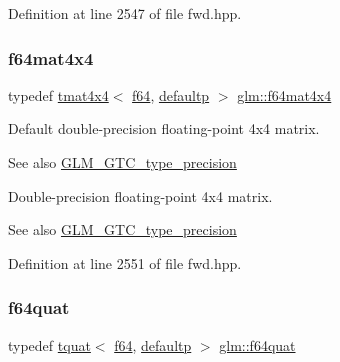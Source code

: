 Definition at line 2547 of file fwd.\+hpp.

\mbox{\label{group__gtc__type__precision_ga6b1ada50de2fc7d991138ab857fb2476}} 
\subsubsection{\texorpdfstring{f64mat4x4}{f64mat4x4}}
{\footnotesize\ttfamily typedef \mbox{\hyperlink{structglm_1_1tmat4x4}{tmat4x4}}$<$ \mbox{\hyperlink{group__gtc__type__precision_ga2bba392e555124b36cde6abba349bab3}{f64}}, \mbox{\hyperlink{namespaceglm_a0f04f086094c747d227af4425893f545a9d21ccd8b5a009ec7eb7677befc3bf51}{defaultp}} $>$ \mbox{\hyperlink{group__gtc__type__precision_ga6b1ada50de2fc7d991138ab857fb2476}{glm\+::f64mat4x4}}}

Default double-\/precision floating-\/point 4x4 matrix. \begin{DoxySeeAlso}{See also}
\mbox{\hyperlink{group__gtc__type__precision}{G\+L\+M\+\_\+\+G\+T\+C\+\_\+type\+\_\+precision}}
\end{DoxySeeAlso}
Double-\/precision floating-\/point 4x4 matrix. \begin{DoxySeeAlso}{See also}
\mbox{\hyperlink{group__gtc__type__precision}{G\+L\+M\+\_\+\+G\+T\+C\+\_\+type\+\_\+precision}} 
\end{DoxySeeAlso}


Definition at line 2551 of file fwd.\+hpp.

\mbox{\label{group__gtc__type__precision_ga5b54d7b36fbee5e271f73e6ed74e7172}} 
\subsubsection{\texorpdfstring{f64quat}{f64quat}}
{\footnotesize\ttfamily typedef \mbox{\hyperlink{structglm_1_1tquat}{tquat}}$<$ \mbox{\hyperlink{group__gtc__type__precision_ga2bba392e555124b36cde6abba349bab3}{f64}}, \mbox{\hyperlink{namespaceglm_a0f04f086094c747d227af4425893f545a9d21ccd8b5a009ec7eb7677befc3bf51}{defaultp}} $>$ \mbox{\hyperlink{group__gtc__type__precision_ga5b54d7b36fbee5e271f73e6ed74e7172}{glm\+::f64quat}}}

